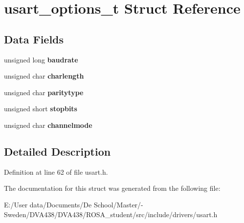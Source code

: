 \hypertarget{structusart__options__t}{}\section{usart\+\_\+options\+\_\+t Struct Reference}
\label{structusart__options__t}
\subsection*{Data Fields}
\begin{DoxyCompactItemize}
\item 
\hypertarget{structusart__options__t_a48e3e204af5eb4ace8224a6765899a14}{}unsigned long {\bfseries baudrate}\label{structusart__options__t_a48e3e204af5eb4ace8224a6765899a14}

\item 
\hypertarget{structusart__options__t_adb9bc2c80e9fcaee6d60f2cd1657d27d}{}unsigned char {\bfseries charlength}\label{structusart__options__t_adb9bc2c80e9fcaee6d60f2cd1657d27d}

\item 
\hypertarget{structusart__options__t_aa5776192a0b4392879df6ebaad821459}{}unsigned char {\bfseries paritytype}\label{structusart__options__t_aa5776192a0b4392879df6ebaad821459}

\item 
\hypertarget{structusart__options__t_a2f7b3610a4547f7aadc0ad414e9aadc0}{}unsigned short {\bfseries stopbits}\label{structusart__options__t_a2f7b3610a4547f7aadc0ad414e9aadc0}

\item 
\hypertarget{structusart__options__t_a2c615c1bf7ab4d2635f3760f63ab15f7}{}unsigned char {\bfseries channelmode}\label{structusart__options__t_a2c615c1bf7ab4d2635f3760f63ab15f7}

\end{DoxyCompactItemize}


\subsection{Detailed Description}


Definition at line 62 of file usart.\+h.



The documentation for this struct was generated from the following file\+:\begin{DoxyCompactItemize}
\item 
E\+:/\+User data/\+Documents/\+De School/\+Master/-\/ Sweden/\+D\+V\+A438/\+D\+V\+A438/\+R\+O\+S\+A\+\_\+student/src/include/drivers/usart.\+h\end{DoxyCompactItemize}
